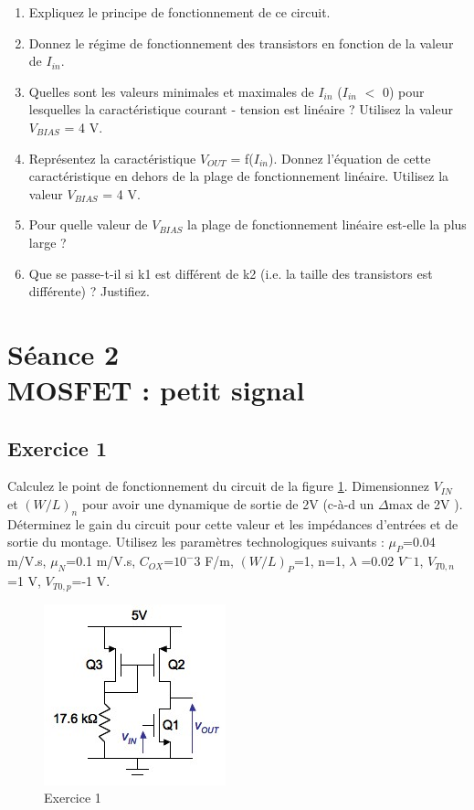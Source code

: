 \documentclass[paper=a4, fontsize=11pt]{article} %
\numberwithin{equation}{section} %
\numberwithin{figure}{section} %
\numberwithin{table}{section} %
\begin{document}
\begin{enumerate}
\item Expliquez le principe de fonctionnement de ce circuit.
\item Donnez le régime de fonctionnement des transistors en fonction de la valeur de $I_{in}$.
\item Quelles sont les valeurs minimales et maximales de $I_{in}$ ($I_{in}$ $<$ 0) pour lesquelles la caractéristique courant - tension est linéaire ? Utilisez la valeur $V_{BIAS}$ = 4 V.
\item Représentez la caractéristique $V_{OUT}$ = f($I_{in}$). Donnez l'équation de cette caractéristique en dehors de la plage de fonctionnement linéaire. Utilisez la valeur $V_{BIAS}$ = 4 V.
\item  Pour quelle valeur de $V_{BIAS}$ la plage de fonctionnement linéaire est-elle la plus large ?
\item  Que se passe-t-il si k1 est différent de k2 (i.e. la taille des transistors est différente) ? Justifiez.
\end{enumerate}















\newpage
\setcounter{section}{2}
\setcounter{figure}{0}
\section{Séance 2\\ MOSFET : petit signal}
\subsection*{Exercice 1}
Calculez le point de fonctionnement du circuit de la figure \ref{fig2-1}. Dimensionnez $V_{IN}$ et $(W/L)_n$ pour avoir une dynamique de sortie de 2V (c-à-d un $\Delta$\vout max de 2V ). Déterminez le gain du circuit pour cette valeur et les impédances d'entrées et de sortie du montage. Utilisez les paramètres technologiques suivants : $\mu_P$=0.04 m/V.s, $\mu_N$=0.1 m/V.s, $C_{OX}$=$10^-3$ F/m, $(W/L)_P$=1, n=1, $\lambda$ =0.02 $V^-1$, $V_{T0,n}$=1 V, $V_{T0,p}$=-1 V.
\begin{figure}[!htbp]
   \centering
   \includegraphics[]{figure/fig2-1.png}
   \caption{Exercice 1}
   \label{fig2-1}
\end{figure}
\end{document}
